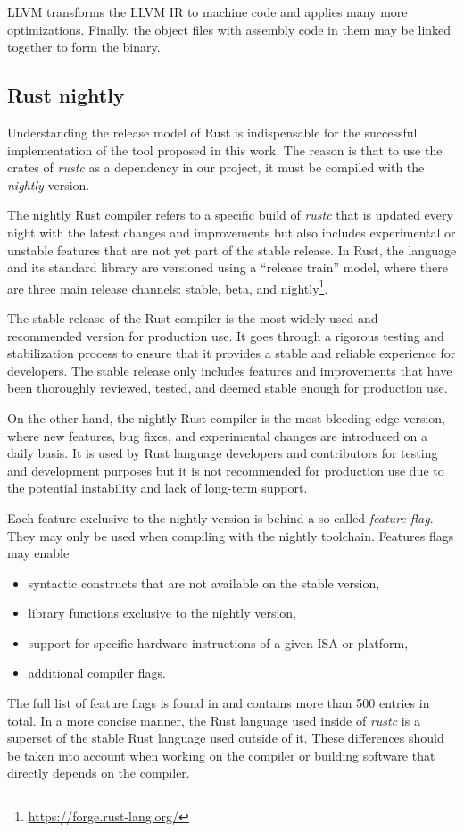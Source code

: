 LLVM transforms the LLVM \acrshort{IR} to machine code
and applies many more optimizations.
Finally, the object files with assembly code in them may be
linked together to form the binary.

\subsection{Rust nightly}
\label{sec:rust-nightly}

Understanding the release model of Rust is indispensable
for the successful implementation of the tool proposed in this work.
The reason is that to use the crates of \emph{rustc} as a dependency in our project,
it must be compiled with the \emph{nightly} version.

The nightly Rust compiler refers to a specific build of \emph{rustc}
that is updated every night with the latest changes and improvements
but also includes experimental or unstable features that are not yet part of the stable release.
In Rust, the language and its standard library are versioned using a ``release train'' model,
where there are three main release channels:
stable, beta, and nightly\footnote{\url{https://forge.rust-lang.org/}}.

The stable release of the Rust compiler is
the most widely used and recommended version for production use.
It goes through a rigorous testing and stabilization process
to ensure that it provides a stable and reliable experience for developers.
The stable release only includes features and improvements
that have been thoroughly reviewed, tested, and deemed stable enough for production use.

On the other hand, the nightly Rust compiler is the most bleeding-edge version,
where new features, bug fixes, and experimental changes are introduced on a daily basis.
It is used by Rust language developers and contributors for testing and development purposes
but it is not recommended for production use
due to the potential instability and lack of long-term support.

Each feature exclusive to the nightly version is behind a so-called \emph{feature flag}.
They may only be used when compiling with the nightly toolchain.
Features flags may enable

\begin{itemize}
      \item syntactic constructs that are not available on the stable version,
      \item library functions exclusive to the nightly version,
      \item support for specific hardware instructions of a given \acrshort{ISA} or platform,
      \item additional compiler flags.
\end{itemize}

The full list of feature flags is found in \cite{unstable-book}
and contains more than 500 entries in total.
In a more concise manner, the Rust language used inside of \emph{rustc} is
a superset of the stable Rust language used outside of it.
These differences should be taken into account
when working on the compiler or building software that directly depends on the compiler.